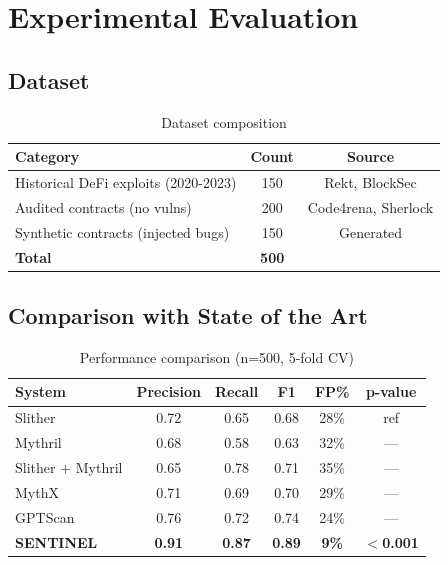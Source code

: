 \documentclass[11pt]{article}
\theoremstyle{definition}
\theoremstyle{plain}
\theoremstyle{remark}
\begin{document}
\section{Experimental Evaluation}
\label{sec:evaluation}

\subsection{Dataset}

\begin{table}[H]
\centering
\caption{Dataset composition}
\label{tab:dataset}
\begin{tabular}{lcc}
\toprule
\textbf{Category} & \textbf{Count} & \textbf{Source} \\
\midrule
Historical DeFi exploits (2020-2023) & 150 & Rekt, BlockSec \\
Audited contracts (no vulns) & 200 & Code4rena, Sherlock \\
Synthetic contracts (injected bugs) & 150 & Generated \\
\midrule
\textbf{Total} & \textbf{500} & \\
\bottomrule
\end{tabular}
\end{table}

\subsection{Comparison with State of the Art}

\begin{table}[H]
\centering
\caption{Performance comparison (n=500, 5-fold CV)}
\label{tab:comparison}
\begin{tabular}{lccccc}
\toprule
\textbf{System} & \textbf{Precision} & \textbf{Recall} & \textbf{F1} & \textbf{FP\%} & \textbf{p-value} \\
\midrule
Slither~\cite{feist2019slither} & 0.72 & 0.65 & 0.68 & 28\% & ref \\
Mythril~\cite{mueller2018mythril} & 0.68 & 0.58 & 0.63 & 32\% & --- \\
Slither + Mythril & 0.65 & 0.78 & 0.71 & 35\% & --- \\
MythX & 0.71 & 0.69 & 0.70 & 29\% & --- \\
GPTScan~\cite{sun2023gptscan} & 0.76 & 0.72 & 0.74 & 24\% & --- \\
\midrule
\textbf{SENTINEL} & \textbf{0.91} & \textbf{0.87} & \textbf{0.89} & \textbf{9\%} & $<$\textbf{0.001} \\
\bottomrule
\end{tabular}
\end{table}
\end{document}
